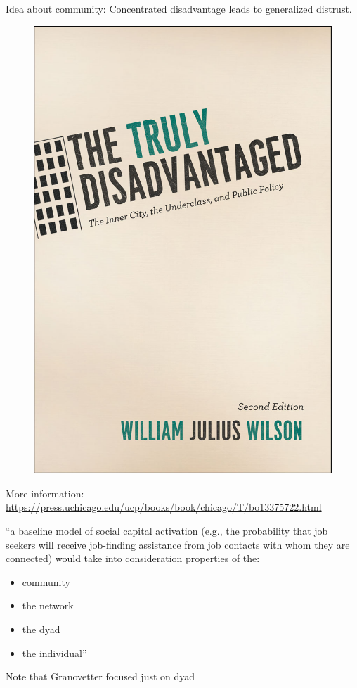 \documentclass[aspectratio=169]{beamer}
\begin{document}
\begin{frame}

Idea about community: Concentrated disadvantage leads to generalized distrust.

\begin{figure}
\includegraphics[height=0.7\textheight]{figures/wilson_truly_1987_cover}
\end{figure}

More information: \url{https://press.uchicago.edu/ucp/books/book/chicago/T/bo13375722.html}
\end{frame}
\begin{frame}

``a baseline model of social capital activation (e.g., the probability that job seekers will receive job-finding assistance from job contacts with whom they are connected) would take into consideration properties of the:\\
\begin{itemize}
\item community
\item the network
\item the dyad
\item the individual''
\end{itemize}

\vfill
Note that Granovetter focused just on dyad

\end{frame}
\end{document}
